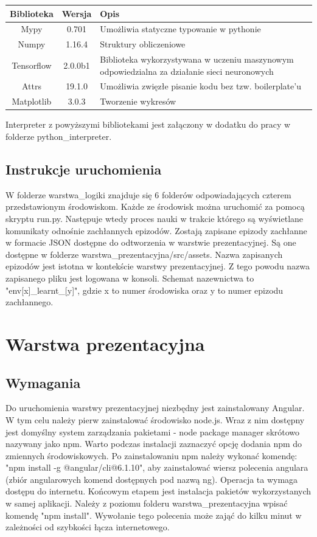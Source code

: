 \documentclass[12pt]{book}
\theoremstyle{plain}
\begin{document}
\renewcommand{\arraystretch}{1.3}
\begin{tabular}{| c | c | L{5cm} |}
	\hline
	Biblioteka   &  Wersja & Opis \\	\hline
	Mypy & 0.701 & Umożliwia statyczne typowanie w pythonie \\ \hline
    Numpy & 1.16.4 & Struktury obliczeniowe \\ \hline
	Tensorflow & 2.0.0b1 &  Biblioteka wykorzystywana w uczeniu maszynowym odpowiedzialna za działanie sieci neuronowych \\ \hline
	Attrs & 19.1.0 & Umożliwia zwięzłe pisanie kodu bez tzw. boilerplate'u \\ \hline
	Matplotlib & 3.0.3 & Tworzenie wykresów \\ \hline
\end{tabular}\newline \newline
Interpreter z powyższymi bibliotekami jest załączony w dodatku do pracy w folderze python\_interpreter.
\subsection{Instrukcje uruchomienia}
W folderze warstwa\_logiki znajduje się 6 folderów odpowiadających czterem przedstawionym środowiskom. Każde ze środowisk można uruchomić za pomocą skryptu run.py. Następuje wtedy proces nauki w trakcie którego są wyświetlane komunikaty odnośnie zachłannych epizodów. Zostają zapisane epizody zachłanne w formacie JSON dostępne do odtworzenia w warstwie prezentacyjnej. Są one dostępne w folderze warstwa\_prezentacyjna/src/assets. Nazwa zapisanych epizodów jest istotna w kontekście warstwy prezentacyjnej. Z tego powodu nazwa zapisanego pliku jest logowana w konsoli. Schemat nazewnictwa to "env[x]_learnt_[y]", gdzie x to numer środowiska oraz y to numer epizodu zachłannego.

\section{Warstwa prezentacyjna}
\subsection{Wymagania}
Do uruchomienia warstwy prezentacyjnej niezbędny jest zainstalowany Angular. W tym celu należy pierw zainstalować środowisko node.js. Wraz z nim dostępny  jest domyślny system zarządzania pakietami - node package manager skrótowo nazywany jako npm. Warto podczas instalacji zaznaczyć opcję dodania npm do zmiennych środowiskowych. Po zainstalowaniu npm należy wykonać komendę: "npm install -g @angular/cli@6.1.10", aby zainstalować wiersz polecenia angulara (zbiór angularowych komend dostępnych pod nazwą ng). Operacja ta wymaga dostępu do internetu. Końcowym etapem jest instalacja pakietów wykorzystanych w samej aplikacji. Należy z poziomu folderu warstwa\_prezentacyjna wpisać komendę "npm install". Wywołanie tego polecenia może zająć do kilku minut w zależności od szybkości łącza internetowego. 
\end{document}
